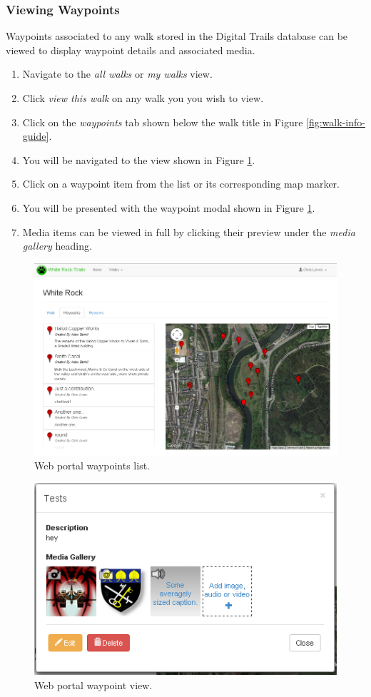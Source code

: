\documentclass[11pt,a4paper]{report}
\begin{document}
\subsubsection{Viewing Waypoints}

Waypoints associated to any walk stored in the Digital Trails database can be viewed to display waypoint details and associated media.

\begin{enumerate}
\item Navigate to the \emph{all walks} or \emph{my walks} view.
\item Click \emph{view this walk} on any walk you you wish to view.
\item Click on the \emph{waypoints} tab shown below the walk title in Figure \ref{fig:walk-info-guide}.
\item You will be navigated to the view shown in Figure \ref{fig:walk-waypoints-guide}.
\item Click on a waypoint item from the list or its corresponding map marker.
\item You will be presented with the waypoint modal shown in Figure \ref{fig:walk-waypoints-guide}.
\item Media items can be viewed in full by clicking their preview under the \emph{media gallery} heading.
\end{enumerate}

\begin{figure}[H]
\centering
\includegraphics[width=0.8\linewidth]{./img/webportal/walk-waypoints}
\caption{Web portal waypoints list.}
\label{fig:walk-waypoints-guide}
\end{figure}

\begin{figure}[H]
\centering
\includegraphics[width=0.7\linewidth]{./img/webportal/waypoint}
\caption{Web portal waypoint view.}
\label{fig:waypoint-guide}
\end{figure}
\end{document}
